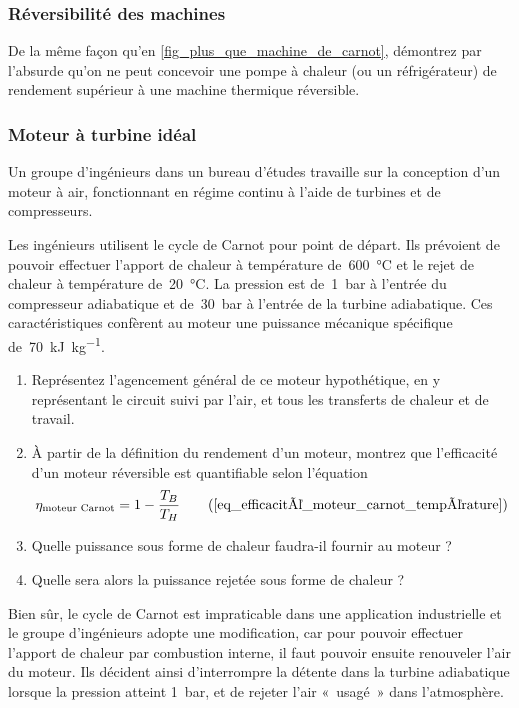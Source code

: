 \subsubsection{Réversibilité des machines}

	De la même façon qu’en \cref{fig_plus_que_machine_de_carnot}, démontrez par l’absurde qu’on ne peut concevoir une pompe à chaleur (ou un réfrigérateur) de rendement supérieur à une machine thermique réversible.


\subsubsection{Moteur à turbine idéal}

	\wherefrom{[DS n°2 2012, 11pts]}

	Un groupe d’ingénieurs dans un bureau d’études travaille sur la conception d’un moteur à air, fonctionnant en régime continu à l’aide de turbines et de compresseurs.

	Les ingénieurs utilisent le cycle de Carnot pour point de départ. Ils prévoient de pouvoir effectuer l’apport de chaleur à température de~\SI{600}{\degreeCelsius} et le rejet de chaleur à température de~\SI{20}{\degreeCelsius}. La pression est de~\SI{1}{\bar} à l’entrée du compresseur adiabatique et de~\SI{30}{\bar} à l’entrée de la turbine adiabatique. Ces caractéristiques confèrent au moteur une puissance mécanique spécifique de~\SI{70}{\kilo\joule\per\kilogram}.

	\begin{enumerate}
		\item Représentez l’agencement général de ce moteur hypothétique, en y représentant le circuit suivi par l’air, et tous les transferts de chaleur et de travail.
		\item À partir de la définition du rendement d’un moteur, montrez que l’efficacité d’un moteur réversible est quantifiable selon l’équation
			\begin{equation}
				\eta_{\text{moteur Carnot}} = 1 - \frac{T_B}{T_H} \tag{\ref{eq_efficacité_moteur_carnot_température}}
			\end{equation}
	
		\item Quelle puissance sous forme de chaleur faudra-il fournir au moteur ?
		\item Quelle sera alors la puissance rejetée sous forme de chaleur ?
	\end{enumerate}

	Bien sûr, le cycle de Carnot est impraticable dans une application industrielle et le groupe d’ingénieurs adopte une modification, car pour pouvoir effectuer l’apport de chaleur par combustion interne, il faut pouvoir ensuite renouveler l’air du moteur. Ils décident ainsi d’interrompre la détente dans la turbine adiabatique lorsque la pression atteint \SI{1}{\bar}, et de rejeter l’air «~usagé~» dans l’atmosphère.
	
